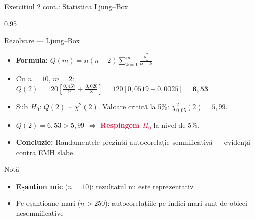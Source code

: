 \documentclass[9pt, aspectratio=169, t]{beamer}
\begin{document}
\begin{frame}[shrink=15]{Exercițiul 2 cont.: Statistica Ljung--Box}
\begin{cminipage}{0.95\textwidth}
\begin{exampleblock}{Rezolvare --- Ljung--Box}
\small
\begin{itemize}\setlength{\itemsep}{0pt}
    \item \textbf{Formula:} $Q(m) = n(n+2)\sum_{k=1}^{m}\frac{\hat\rho_k^2}{n-k}$
    \item Cu $n = 10$, $m = 2$:
$Q(2) = 120 \left[\frac{0{,}467}{9} + \frac{0{,}020}{8}\right]
= 120 [0{,}0519 + 0{,}0025] = \mathbf{6{,}53}$
    \item Sub $H_0$: $Q(2) \sim \chi^2(2)$. Valoare critică la 5\%: $\chi^2_{0{,}05}(2) = 5{,}99$.
    \item $Q(2) = 6{,}53 > 5{,}99$ $\Rightarrow$ \textcolor{Crimson}{\textbf{Respingem $H_0$}} la nivel de 5\%.
    \item \textbf{Concluzie:} Randamentele prezintă autocorelație semnificativă --- evidență contra EMH slabe.
\end{itemize}
\end{exampleblock}

\begin{alertblock}{Notă}
\begin{itemize}\setlength{\itemsep}{0pt}
    \item \textbf{Eșantion mic} ($n = 10$): rezultatul nu este reprezentativ
    \item Pe eșantioane mari ($n > 250$): autocorelațiile pe indici mari sunt de obicei nesemnificative
\end{itemize}
\end{alertblock}
\end{cminipage}
\end{frame}
\end{document}
